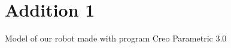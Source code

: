 \section{Addition 1}
Model of our robot made with program Creo Parametric 3.0

\vspace{0.5em}

\begin{figure}[H]
	\begin{minipage}[h]{0.47\linewidth}
	\end{minipage}
	\hfill
	\begin{minipage}[h]{0.47\linewidth}
	\end{minipage}
\end{figure}

\vspace{0.5em}

\begin{figure}[H]
	\begin{minipage}[h]{0.47\linewidth}
	\end{minipage}
	\hfill
	\begin{minipage}[h]{0.47\linewidth}
	\end{minipage}
\end{figure}

